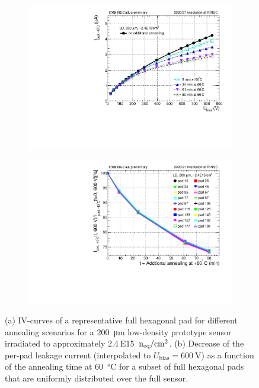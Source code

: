 \begin{figure}
	\captionsetup[subfigure]{aboveskip=-1pt,belowskip=-1pt}
	\centering
	\begin{subfigure}[b]{0.49\textwidth}
		\includegraphics[width=0.999\textwidth]{plots/annealing_iv/annealing_IV_ch24.pdf}
		\subcaption{
		}
		\label{plot:annealing_IV}
	\end{subfigure}
	\hfill
	\begin{subfigure}[b]{0.49\textwidth}
		\includegraphics[width=0.999\textwidth]{plots/annealing_iv/annealing_current.pdf}
		\subcaption{
		}
		\label{plot:annealing_current}
	\end{subfigure}    

	\caption{
		(a) IV-curves of a representative full hexagonal pad for different annealing scenarios for a \SI{200}{\micro\metre} low-density prototype sensor irradiated to approximately 2.4$~$E15~$\mathrm{n_{eq}}/\mathrm{cm}^{2}$.
        (b) Decrease of the per-pad leakage current (interpolated to $U_\text{bias}=\SI{600}{\volt}$) as a function of the annealing time at \SI{60}{\celsius} for a subset of full hexagonal pads that are uniformly distributed over the full sensor.
	}
\end{figure}
